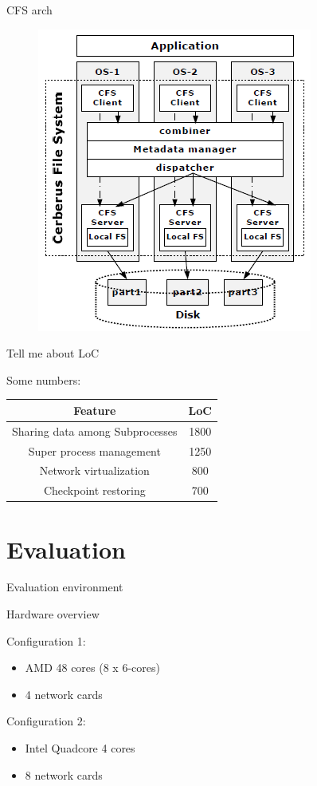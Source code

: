 \documentclass{beamer}
\begin{document}
	\begin{frame}{CFS arch}

		\begin{figure} [H]
			\centering
			\includegraphics[scale=0.45]{img/cerberus-cfs}
		\end{figure}	

	\end{frame}
	
	\begin{frame}{Tell me about LoC}
	
	Some numbers:	
	
	\begin{tabular}{|c|c|}
	\hline Feature & LoC  \\ 
	\hline Sharing data among Subprocesses & 1800 \\ 
	\hline Super process management & 1250 \\ 
	\hline Network virtualization & 800 \\ 
	\hline Checkpoint  restoring & 700 \\ 	
	\hline 
	\end{tabular} 
	
	\end{frame}

\section{Evaluation}

	\begin{frame}{Evaluation environment}

	Hardware overview
	
	Configuration 1:
	\begin{itemize}
	\item AMD 48 cores (8 x 6-cores) 
	\item 4 network cards
	\end{itemize}	

	Configuration 2:
	\begin{itemize}
	\item Intel Quadcore 4 cores
	\item 8 network cards
	\end{itemize}	
	\end{frame}
\end{document}
